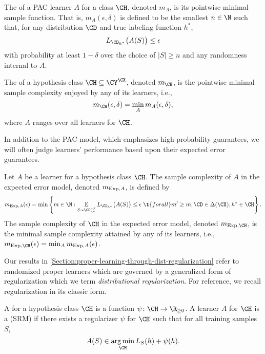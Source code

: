 \documentclass[11pt]{article}
\begin{document}
\begin{definition}
The  of a PAC learner $A$ for a class $\CH$, denoted $m_A$, is its pointwise minimal sample function. That is, $m_{A}(\epsilon, \delta)$ is defined to be the smallest $n \in \N$ such that, for any distribution $\CD$ and true labeling function $h^*$, 
\[ L_{\CD_{h^*}}\big( A(S) \big) \leq \epsilon \]
with probability at least $1 - \delta$ over the choice of $|S| \geq n$ and any randomness internal to $A$. 
\end{definition}

\begin{definition}
The  of a hypothesis class $\CH \subseteq \CY^\CX$, denoted $m_\CH$, is the pointwise minimal sample complexity enjoyed by any of its learners, i.e., 
\[ m_\CH(\epsilon, \delta) = \min_A m_A(\epsilon, \delta), \]
where $A$ ranges over all learners for $\CH$.
\end{definition}

In addition to the PAC model, which emphasizes high-probability guarantees, we will often judge learners' performance based upon their expected error guarantees. 

\begin{definition}\label{Definition:expected-error-model}
Let $A$ be a learner for a hypothesis class $\CH$. The sample complexity of $A$ in the expected error model, denoted $m_{\operatorname{Exp}, A}$, is defined by
\[ m_{\Exp, A}(\epsilon) = \min \left \{m \in \N : \E_{S \sim \CD_{h^*}^{m'}} L_{\CD_{h^*}}\big (A(S) \big) \leq \epsilon \; \t{ for all } m'\geq m, \CD \in \Delta(\CX), h^* \in \CH \right \}.  \]
The sample complexity of $\CH$ in the expected error model, denoted $m_{\Exp, \CH}$, is the minimal sample complexity attained by any of its learners, i.e., $m_{\Exp, \CH}(\epsilon) = \min_{A} m_{\Exp, A} (\epsilon)$.
\end{definition}

Our results in \cref{Section:proper-learning-through-dist-regularization} refer to randomized proper learners which are governed by a generalized form of regularization which we term \emph{distributional regularization}. For reference, we recall regularization in its classic form. 

\begin{definition}\label{Definition:SRM}
A  for a hypothesis class $\CH$ is a function $\psi \colon \CH \to \R_{\geq 0}$. A learner $A$ for $\CH$ is a  (SRM) if there exists a regularizer $\psi$ for $\CH$ such that for all training samples $S$, 
\[ A(S) \in \argmin_\CH L_S(h) + \psi(h). \]
\end{definition}
\end{document}
